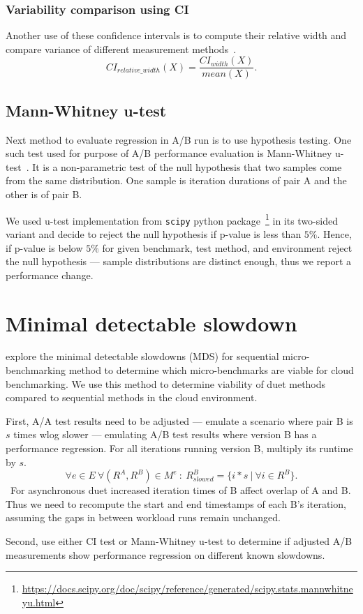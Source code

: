 \subsubsection{Variability comparison using CI}
\label{sec:ci_width}

Another use of these confidence intervals is to compute their relative width and compare variance of different measurement methods~\cite{bulej2019initial}.
$$
CI_{relative\_width}(X) = \frac{CI_{width}(X)}{mean(X)}.
$$

\subsection{Mann-Whitney u-test}
\label{sec:utest}

Next method to evaluate regression in A/B run is to use hypothesis testing.
One such test used for purpose of A/B performance evaluation is Mann-Whitney \mbox{u-test}~\cite{bulej2017stat,laaber2019software}.
It is a non-parametric test of the null hypothesis that two samples come from the same distribution.
One sample is iteration durations of pair A and the other is of pair B.

We used \mbox{u-test} implementation from \lstinline{scipy} python package~\footnote{\url{https://docs.scipy.org/doc/scipy/reference/generated/scipy.stats.mannwhitneyu.html}} in its two-sided variant and decide to reject the null hypothesis if \mbox{p-value} is less than $5\%$.
Hence, if \mbox{p-value} is below $5\%$ for given benchmark, test method, and environment reject the null hypothesis --- sample distributions are distinct enough, thus we report a performance change.


\section{Minimal detectable slowdown}
\label{sec:mds}

 explore the minimal detectable slowdowns (MDS) for sequential micro-benchmarking method to determine which micro-benchmarks are viable for cloud benchmarking.
We use this method to determine viability of duet methods compared to sequential methods in the cloud environment.

First, A/A test results need to be adjusted --- emulate a scenario where pair B is $s$ times wlog slower --- emulating A/B test results where version B has a performance regression.
For all iterations running version B, multiply its runtime by $s$.
$$
\forall e \in E ~ \forall (R^A, R^B) \in M^{e} ~:~ R^B_{slowed} = \{i * s~|~\forall i \in R^B \}.
$$\
For asynchronous duet increased iteration times of B affect overlap of A and B.
Thus we need to recompute the start and end timestamps of each B's iteration, assuming the gaps in between workload runs remain unchanged.

Second, use either CI test or Mann-Whitney u-test to determine if adjusted A/B measurements show performance regression on different known slowdowns.
